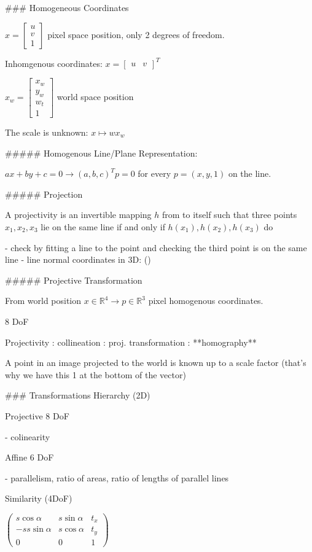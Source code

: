 ### Homogeneous Coordinates

$x = \left[\begin{matrix} u \\ v\\ 1 \end{matrix}\right]$ pixel space position, only 2 degrees of freedom.

Inhomgenous coordinates: $x = [\begin{matrix} u & v \end{matrix}]^T $

$ x_w = \left[ \begin{matrix} x_w \\  y_w \\ w_t\\  1 \end{matrix} \right] $ world space position

The scale is unknown: $x \mapsto  w x_w$

##### Homogenous Line/Plane Representation:

$ax+by+c = 0 \to (a,b,c)^T p = 0$ for every $p = (x,y,1)$ on the line.

##### Projection

A projectivity is an invertible mapping $h$ from  to itself such that three points $x_1 , x_2 , x_3$ lie on the same line if and only if $h(x_1), h(x_2 ), h(x_3)$ do

- check by fitting a line to the point and checking the third point is on the same line
- line normal coordinates in 3D: ()

##### Projective Transformation

From  world position $x \in \mathbb R^4 \to p \in \mathbb R^3$ pixel homogenous coordinates. 

8 DoF

Projectivity : collineation :  proj. transformation : **homography**

A point in an image projected to the world is known up to a scale factor (that's why we have this 1 at the bottom of the vector)

### Transformations Hierarchy (2D)

Projective 8 DoF

- colinearity

Affine 6 DoF

- parallelism, ratio of areas, ratio of lengths of parallel lines

Similarity (4DoF)

$\left(  \begin{matrix} s\cos  \alpha &  s\sin \alpha  & t_x \\  -s s\sin \alpha & s\cos \alpha & t_y \\ 0 & 0 & 1  \end{matrix} \right)$

